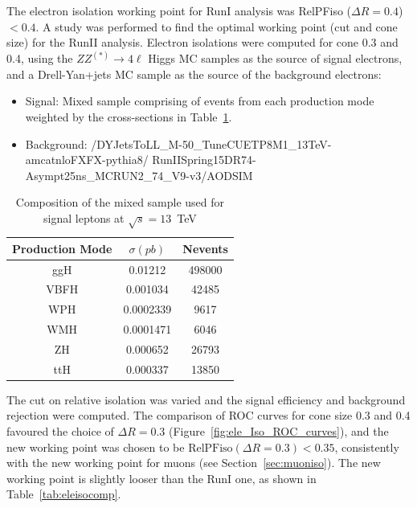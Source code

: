 The electron isolation working point for RunI analysis was RelPFiso ($\Delta R = 0.4$) $< 0.4$.
A study was performed to find the optimal working point (cut and cone size) for the RunII analysis.
Electron isolations were computed for cone 0.3 and 0.4, using the  $ZZ^{(*)}\to4\ell$ Higgs MC samples as the
source of signal electrons, and a Drell-Yan+jets MC sample as the source of the background electrons:
\begin{itemize}
\item{Signal: Mixed sample comprising of events from each production mode weighted by the cross-sections in Table~\ref{tab:samplecomp}.}
\item{Background: /DYJetsToLL\_M-50\_TuneCUETP8M1\_13TeV-amcatnloFXFX-pythia8/ RunIISpring15DR74-Asympt25ns\_MCRUN2\_74\_V9-v3/AODSIM }
\end{itemize}

\begin{table}[h]
    \centering
    \begin{tabular}{|c|c|c|}
\hline %
Production Mode & $\sigma (pb)$ & Nevents   \\
\hline %
ggH    &      0.01212    &     498000  \\
\hline %
VBFH   &      0.001034   &      42485  \\
\hline %
WPH    &      0.0002339  &       9617    \\
\hline %
WMH    &      0.0001471  &       6046  \\
\hline %
ZH     &      0.000652   &      26793  \\
\hline %
ttH    &      0.000337   &      13850  \\
\hline %
     \end{tabular}
    \caption{Composition of the mixed sample used for signal leptons at $\sqrt{s} =  13$~TeV}
    \label{tab:samplecomp}
\end{table}
\par
The cut on relative isolation was varied and the signal efficiency and background rejection were computed.
The comparison of ROC curves for cone size 0.3 and 0.4 favoured the choice of $\Delta R = 0.3$ (Figure~\ref{fig:ele_Iso_ROC_curves}), and the new working point was 
chosen to be $\text{RelPFiso}(\Delta R = 0.3) < 0.35$, consistently with the new working point for muons (see Section~\ref{sec:muoniso}). The new working point is
slightly looser than the RunI one, as shown in Table~\ref{tab:eleisocomp}.

